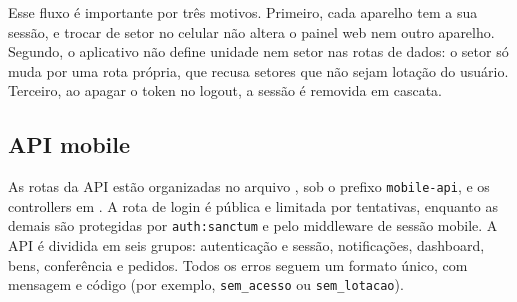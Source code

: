 \documentclass[12pt,a4paper]{article}
\begin{document}
Esse fluxo é importante por três motivos. Primeiro, cada aparelho tem a sua sessão, e trocar de setor no celular não altera o painel web nem outro aparelho. Segundo, o aplicativo não define unidade nem setor nas rotas de dados: o setor só muda por uma rota própria, que recusa setores que não sejam lotação do usuário. Terceiro, ao apagar o token no logout, a sessão é removida em cascata.

\subsection{API mobile}

As rotas da API estão organizadas no arquivo , sob o prefixo \texttt{mobile-api}, e os controllers em . A rota de login é pública e limitada por tentativas, enquanto as demais são protegidas por \texttt{auth:sanctum} e pelo middleware de sessão mobile. A API é dividida em seis grupos: autenticação e sessão, notificações, dashboard, bens, conferência e pedidos. Todos os erros seguem um formato único, com mensagem e código (por exemplo, \texttt{sem\_acesso} ou \texttt{sem\_lotacao}).
\end{document}
